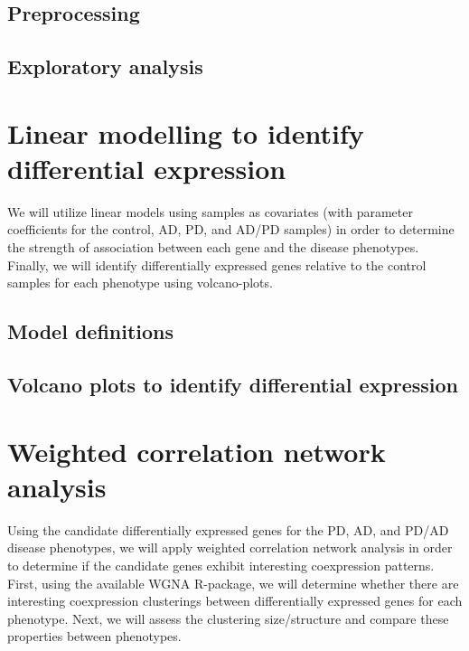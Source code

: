 \subsection{Preprocessing}
\label{subsec:preprocessing}

\subsection{Exploratory analysis}
\label{subsec:exploratory-analysis}



\section{Linear modelling to identify differential expression}
\label{sec:line-modell-ident}

We will utilize linear models using samples as covariates (with parameter coefficients for the control, AD, PD, and AD/PD samples) in order to determine the strength of association between each gene and the disease phenotypes. Finally, we will identify differentially expressed genes relative to the control samples for each phenotype using  volcano-plots.


\subsection{Model definitions}
\label{subsec:model-definitions}

\subsection{Volcano plots to identify differential expression}
\label{subsec:volc-plots-ident}


\section{Weighted correlation network analysis}
\label{sec:weight-corr-netw}

 Using the candidate differentially expressed genes for the PD, AD, and PD/AD disease phenotypes, we will apply weighted correlation network analysis in order to determine if the candidate genes exhibit interesting coexpression patterns. First, using the available WGNA R-package\cite{Langfelder2008}, we will determine whether there are interesting coexpression clusterings between differentially expressed genes for each phenotype. Next, we will assess the clustering size/structure and compare these properties between phenotypes.


